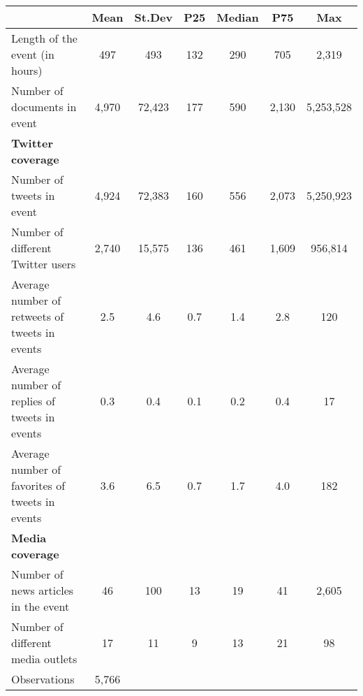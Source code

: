 {
\def\sym#1{\ifmmode^{#1}\else\(^{#1}\)\fi}
\begin{tabular}{l*{1}{cccccc}}
\hline\hline
                    &        Mean&      St.Dev&         P25&      Median&         P75&         Max\\
\hline
Length of the event (in hours)&         497&         493&         132&         290&         705&       2,319\\
Number of documents in event&       4,970&      72,423&         177&         590&       2,130&   5,253,528\\
\textbf{Twitter coverage}&            &            &            &            &            &            \\
Number of tweets in event&       4,924&      72,383&         160&         556&       2,073&   5,250,923\\
Number of different Twitter users&       2,740&      15,575&         136&         461&       1,609&     956,814\\
Average number of retweets of tweets in events&         2.5&         4.6&         0.7&         1.4&         2.8&         120\\
Average number of replies of tweets in events&         0.3&         0.4&         0.1&         0.2&         0.4&          17\\
Average number of favorites of tweets in events&         3.6&         6.5&         0.7&         1.7&         4.0&         182\\
\textbf{Media coverage}&            &            &            &            &            &            \\
Number of news articles in the event&          46&         100&          13&          19&          41&       2,605\\
Number of different media outlets&          17&          11&           9&          13&          21&          98\\
\hline
Observations        &       5,766&            &            &            &            &            \\
\hline\hline
\end{tabular}
}
